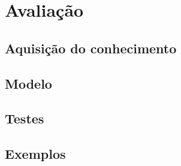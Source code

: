 \chapter{Avaliação}

\section{Aquisição do conhecimento}
\section{Modelo}
\section{Testes}
\section{Exemplos}
